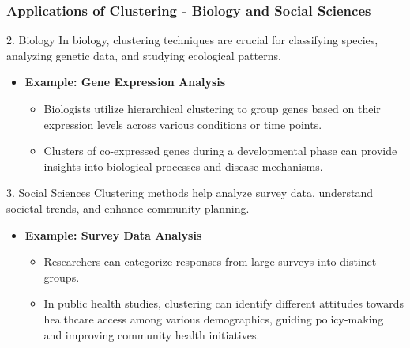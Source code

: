 \documentclass[aspectratio=169]{beamer}
\begin{document}
\begin{frame}[fragile]
    \frametitle{Applications of Clustering - Biology and Social Sciences}
    \begin{block}{2. Biology}
        In biology, clustering techniques are crucial for classifying species, analyzing genetic data, and studying ecological patterns.
    \end{block}
    
    \begin{itemize}
        \item \textbf{Example: Gene Expression Analysis}
        \begin{itemize}
            \item Biologists utilize hierarchical clustering to group genes based on their expression levels across various conditions or time points.
            \item Clusters of co-expressed genes during a developmental phase can provide insights into biological processes and disease mechanisms.
        \end{itemize}
    \end{itemize}
    
    \begin{block}{3. Social Sciences}
        Clustering methods help analyze survey data, understand societal trends, and enhance community planning.
    \end{block}

    \begin{itemize}
        \item \textbf{Example: Survey Data Analysis}
        \begin{itemize}
            \item Researchers can categorize responses from large surveys into distinct groups.
            \item In public health studies, clustering can identify different attitudes towards healthcare access among various demographics, guiding policy-making and improving community health initiatives.
        \end{itemize}
    \end{itemize}
\end{frame}
\end{document}
